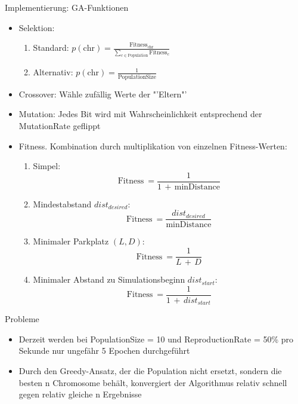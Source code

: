 \documentclass[12pt]{beamer}
\begin{document}
\begin{frame}{Implementierung: GA-Funktionen}
	\begin{itemize}
		\item Selektion:
		\begin{enumerate}
			\item Standard: $p(\text{chr})=\frac{\text{Fitness}_\text{chr}}{\sum_{c \in \text{Population}} \text{Fitness}_c}$
			\item Alternativ: $p(\text{chr}) = \frac{1}{\text{PopulationSize}}$
		\end{enumerate}
		\item Crossover: Wähle zufällig Werte der "'Eltern"'
		\item Mutation: Jedes Bit wird mit Wahrscheinlichkeit entsprechend der MutationRate geflippt
	\end{itemize}
\end{frame}

\begin{frame}
	\begin{itemize}
		\item Fitness. Kombination durch multiplikation von einzelnen Fitness-Werten:
		\begin{enumerate}
			\item Simpel:\\
			$$\text{Fitness} ~= \frac{1}{1 \,+\, \text{minDistance}}$$
			\item Mindestabstand $dist_{desired}$:\\
			$$\text{Fitness} ~= \frac{dist_{desired}}{\text{minDistance}}$$
			\item Minimaler Parkplatz $(L, D)$:\\
			$$\text{Fitness} ~=\frac{1}{L \,+\, D}$$
			\item Minimaler Abstand zu Simulationsbeginn $dist_{start}$:\\
			$$\text{Fitness} ~= \frac{1}{1 \,+\, dist_{start}}$$
		\end{enumerate}
	\end{itemize}
\end{frame}

\begin{frame}{Probleme}
	\begin{itemize}
		\item Derzeit werden bei PopulationSize = 10 und ReproductionRate = 50\% pro Sekunde nur ungefähr 5 Epochen durchgeführt
		\item Durch den Greedy-Ansatz, der die Population nicht ersetzt, sondern die besten n Chromosome behält, konvergiert der Algorithmus relativ schnell gegen relativ gleiche n Ergebnisse
	\end{itemize}
\end{frame}
\end{document}
